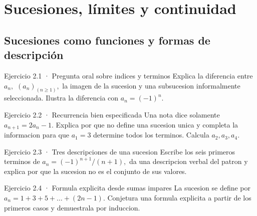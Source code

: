 \documentclass[10pt,a4paper,oneside,openany]{book}
\begin{document}
\chapter{Sucesiones, límites y continuidad}
\section{Sucesiones como funciones y formas de descripción}
\begin{PSevenExerciseFixed}{Ejercicio 2.1 · Pregunta oral sobre indices y terminos}
Explica la diferencia entre \(a_n,\) \((a_n)_(n\ge 1),\) la imagen de la sucesion y una subsucesion informalmente seleccionada. Ilustra la diferencia con \(a_n=(-1)^n\).
\end{PSevenExerciseFixed}
\begin{PSevenExerciseFixed}{Ejercicio 2.2 · Recurrencia bien especificada}
Una nota dice solamente \(a_{n+1}=2a_n-1\). Explica por que no define una sucesion unica y completa la informacion para que \(a_1=3\) determine todos los terminos. Calcula \(a_2,a_3,a_4\).
\end{PSevenExerciseFixed}
\begin{PSevenExerciseFixed}{Ejercicio 2.3 · Tres descripciones de una sucesion}
Escribe los seis primeros terminos de \(a_n=(-1)^{n+1}/(n+1),\) da una descripcion verbal del patron y explica por que la sucesion no es el conjunto de sus valores.
\end{PSevenExerciseFixed}
\begin{PSevenExerciseFixed}{Ejercicio 2.4 · Formula explicita desde sumas impares}
La sucesion se define por \(a_n=1+3+5+\ldots +(2n-1)\). Conjetura una formula explicita a partir de los primeros casos y demuestrala por induccion.
\end{PSevenExerciseFixed}
\end{document}
